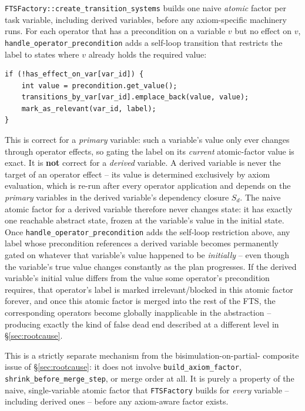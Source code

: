\documentclass[11pt,a4paper]{article}
\begin{document}
\texttt{FTSFactory::create\_transition\_systems} builds one naive
\emph{atomic} factor per task variable, including derived variables, before
any axiom-specific machinery runs. For each operator that has a precondition
on a variable $v$ but no effect on $v$, \texttt{handle\_operator\_precondition}
adds a self-loop transition that restricts the label to states where $v$
already holds the required value:
\begin{lstlisting}
if (!has_effect_on_var[var_id]) {
    int value = precondition.get_value();
    transitions_by_var[var_id].emplace_back(value, value);
    mark_as_relevant(var_id, label);
}
\end{lstlisting}
This is correct for a \emph{primary} variable: such a variable's value only
ever changes through operator effects, so gating the label on its
\emph{current} atomic-factor value is exact. It is \textbf{not} correct for a
\emph{derived} variable. A derived variable is never the target of an
operator effect -- its value is determined exclusively by axiom evaluation,
which is re-run after every operator application and depends on the
\emph{primary} variables in the derived variable's dependency closure
$S_d$. The naive atomic factor for a derived variable therefore never
changes state: it has exactly one reachable abstract state, frozen at the
variable's value in the initial state. Once
\texttt{handle\_operator\_precondition} adds the self-loop restriction above,
any label whose precondition references a derived variable becomes
permanently gated on whatever that variable's value happened to be
\emph{initially} -- even though the variable's true value changes constantly
as the plan progresses. If the derived variable's initial value differs from
the value some operator's precondition requires, that operator's label is
marked irrelevant/blocked in this atomic factor forever, and once this
atomic factor is merged into the rest of the FTS, the corresponding
operators become globally inapplicable in the abstraction -- producing
exactly the kind of false dead end described at a different level in
\S\ref{sec:rootcause}.

This is a strictly separate mechanism from the bisimulation-on-partial-
composite issue of \S\ref{sec:rootcause}: it does not involve
\texttt{build\_axiom\_factor}, \texttt{shrink\_before\_merge\_step}, or merge
order at all. It is purely a property of the naive, single-variable atomic
factor that \texttt{FTSFactory} builds for \emph{every} variable -- including
derived ones -- before any axiom-aware factor exists.
\end{document}
